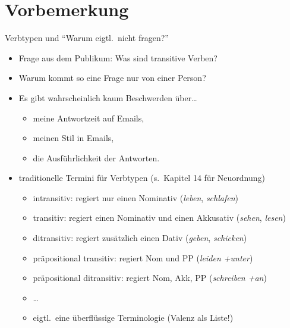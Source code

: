 
\section{Vorbemerkung}

\begin{frame}
  {Verbtypen und "`Warum eigtl.\ nicht fragen?"'}
  \pause
  \begin{itemize}[<+->]
    \item Frage aus dem Publikum: \alert{Was sind transitive Verben?}
    \item Warum kommt so eine Frage nur von einer Person?
    \item Es gibt wahrscheinlich kaum Beschwerden über\ldots
      \begin{itemize}[<+->]
        \item meine Antwortzeit auf Emails,
        \item meinen Stil in Emails,
        \item die Ausführlichkeit der Antworten.
      \end{itemize}
    \Halbzeile
    \item traditionelle Termini für Verbtypen (s.\ Kapitel 14 für Neuordnung)
      \begin{itemize}[<+->]
        \item \alert{intransitiv}: regiert nur einen Nominativ (\textit{leben}, \textit{schlafen})
        \item \alert{transitiv}: regiert einen Nominativ und einen Akkusativ (\textit{sehen}, \textit{lesen})
        \item \alert{ditransitiv}: regiert zusätzlich einen Dativ (\textit{geben}, \textit{schicken})
        \item \alert{präpositional transitiv}: regiert Nom und PP (\textit{leiden +unter})
        \item \alert{präpositional ditransitiv}: regiert Nom, Akk, PP (\textit{schreiben +an})
        \item \ldots
          \Halbzeile
        \item \alert{eigtl.\ eine überflüssige Terminologie (Valenz als Liste!)}
      \end{itemize}
  \end{itemize}
\end{frame}

